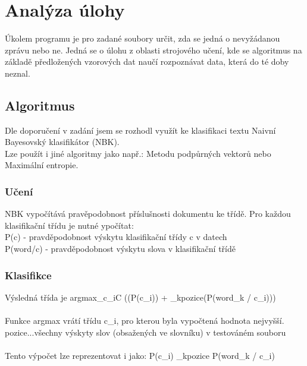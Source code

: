 \documentclass[12pt, a4paper]{report}
\begin{document}


\chapter{Analýza úlohy}

Úkolem programu je pro zadané soubory určit, zda se jedná o nevyžádanou zprávu nebo ne. Jedná se o úlohu z oblasti strojového učení, kde se algoritmus na základě předložených vzorových dat naučí rozpoznávat data, která do té doby neznal.

\section{Algoritmus}
Dle doporučení v zadání jsem se rozhodl využít ke klasifikaci textu Naivní Bayesovský klasifikátor (NBK).\\
Lze použít i jiné algoritmy jako např.: Metodu podpůrných vektorů nebo Maximální entropie.

\subsection{Učení}
NBK vypočítává pravěpodobnost příslušnosti dokumentu ke třídě. Pro každou klasifikační třídu je nutné ypočítat:\\
P(c) - pravděpodobnost výskytu klasifikační třídy c v datech\\
P(word/c) - pravděpodobnost výskytu slova v klasifikační třídě

\subsection{Klasifikce}
Výsledná třída je argmax_{c_i\in C} {\left(\log(P(c_i)) + \sum_{k\in pozice}\log(P(word_k / c_i))\right)}\\
\\
Funkce argmax vrátí třídu c_i, pro kterou byla vypočtená hodnota nejvyšší.\\
pozice...všechny výskyty slov (obsažených ve slovníku) v testováném souboru\\
\\
Tento výpočet lze reprezentovat i jako: P(c_i) \times \prod_{k\in pozice} P(word_k / c_i)
\end{document}
